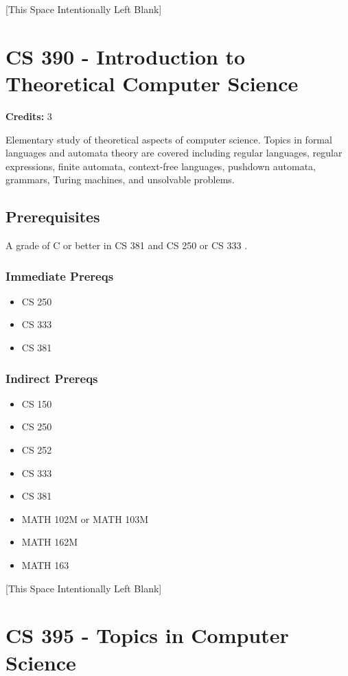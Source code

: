 \documentclass[]{article}
\providecommand{\tightlist}{%
  \setlength{\itemsep}{0pt}\setlength{\parskip}{0pt}}
\newcommand{\pagebreakhere}{
\vspace*{\fill}
\begin{center}
[This Space Intentionally Left Blank]
\end{center}
\vspace*{\fill}
\newpage
}
\begin{document}
\pagebreakhere
\section{CS 390 - Introduction to Theoretical Computer
Science}\label{cs-390---introduction-to-theoretical-computer-science}

\textbf{Credits:} 3

Elementary study of theoretical aspects of computer science. Topics in
formal languages and automata theory are covered including regular
languages, regular expressions, finite automata, context-free languages,
pushdown automata, grammars, Turing machines, and unsolvable problems.

\subsection{Prerequisites}\label{prerequisites-24}

A grade of C or better in CS 381 and CS 250 or CS 333 .

\subsubsection{Immediate Prereqs}\label{immediate-prereqs-17}

\begin{itemize}
\tightlist
\item
  CS 250
\item
  CS 333
\item
  CS 381
\end{itemize}

\subsubsection{Indirect Prereqs}\label{indirect-prereqs-17}

\begin{itemize}
\tightlist
\item
  CS 150
\item
  CS 250
\item
  CS 252
\item
  CS 333
\item
  CS 381
\item
  MATH 102M or MATH 103M
\item
  MATH 162M
\item
  MATH 163
\end{itemize}

\pagebreakhere
\section{CS 395 - Topics in Computer
Science}\label{cs-395---topics-in-computer-science}
\end{document}
